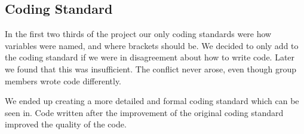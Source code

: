 \subsection{Coding Standard}
In the first two thirds of the project our only coding standards were how variables were named, and where brackets should be. We decided to only add to the coding standard if we were in disagreement about how to write code. Later we found that this was insufficient. The conflict never arose, even though group members wrote code differently.

We ended up creating a more detailed and formal coding standard which can be seen in. Code written after the improvement of the original coding standard improved the quality of the code.